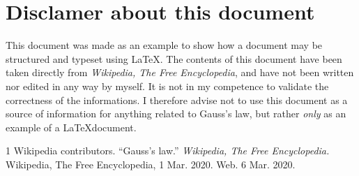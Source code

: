 \documentclass[a4paper, 12pt]{article}
\begin{document}
\appendix
\section{Disclamer about this document}
This document was made as an example to show how a document may be structured and typeset using \LaTeX. The contents of this document have been taken directly from \textit{Wikipedia, The Free Encyclopedia}, and have not been written nor edited in any way by myself. It is not in my competence to validate the correctness of the informations. I therefore advise not to use this document as a source of information for anything related to Gauss's law, but rather \emph{only} as an example of a \LaTeX document.


\begin{thebibliography}{1}
     Wikipedia contributors.
        ``Gauss's law.''
        \textit{Wikipedia, The Free Encyclopedia.}
        Wikipedia, The Free Encyclopedia, 1 Mar. 2020. Web. 6 Mar. 2020. 
\end{thebibliography}
\end{document}
